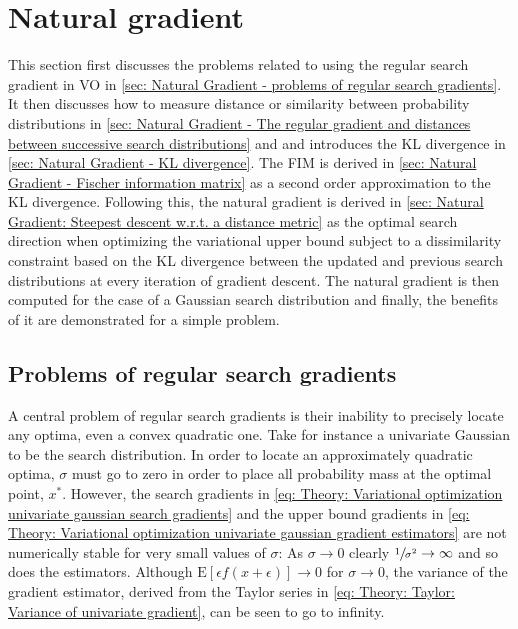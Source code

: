 
\section{Natural gradient}\label{sec: Natural Gradient}
This section first discusses the problems related to using the regular search gradient in \gls{VO} in \autoref{sec: Natural Gradient - problems of regular search gradients}. It then discusses how to measure distance or similarity between probability distributions in \autoref{sec: Natural Gradient - The regular gradient and distances between successive search distributions} and and introduces the \gls{KL} divergence in \autoref{sec: Natural Gradient - KL divergence}. The \gls{FIM} is derived in \autoref{sec: Natural Gradient - Fischer information matrix} as a second order approximation to the \gls{KL} divergence. Following this, the natural gradient is derived in \autoref{sec: Natural Gradient: Steepest descent w.r.t. a distance metric} as the optimal search direction when optimizing the variational upper bound subject to a dissimilarity constraint based on the \gls{KL} divergence between the updated and previous search distributions at every iteration of gradient descent. The natural gradient is then computed for the case of a Gaussian search distribution and finally, the benefits of it are demonstrated for a simple problem.

\subsection{Problems of regular search gradients}\label{sec: Natural Gradient - problems of regular search gradients}
A central problem of regular search gradients is their inability to precisely locate any optima, even a convex quadratic one. Take for instance a univariate Gaussian to be the search distribution. In order to locate an approximately quadratic optima, $\sigma$ must go to zero in order to place all probability mass at the optimal point, $x^*$. 
However, the search gradients in \eqref{eq: Theory: Variational optimization univariate gaussian search gradients} and the upper bound gradients in \eqref{eq: Theory: Variational optimization univariate gaussian gradient estimators} are not numerically stable for very small values of $\sigma$: As $\sigma\rightarrow0$ clearly $\sfrac{1}{\sigma^2}\rightarrow\infty$ and so does the estimators. Although $\text{E}\left[\epsilon f(x+\epsilon)\right]\rightarrow0$ for $\sigma\rightarrow0$, the variance of the gradient estimator, derived from the Taylor series in \eqref{eq: Theory: Taylor: Variance of univariate gradient}, can be seen to go to infinity.

